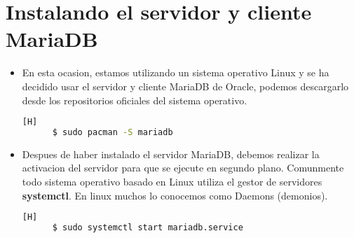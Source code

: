 \newpage %
\section{Instalando el servidor y cliente MariaDB}
\begin{itemize}
  \item En esta ocasion, estamos utilizando un sistema operativo Linux y se ha decidido usar el servidor y cliente MariaDB de Oracle, podemos descargarlo desde los repositorios oficiales del sistema operativo.  
  \begin{lstlisting}[language=bash,caption={Descargando el servidor y el cliente MariaDB}][H]
	  $ sudo pacman -S mariadb
  \end{lstlisting}
\end{itemize}

\begin{itemize}
  \item Despues de haber instalado el servidor MariaDB, debemos realizar la activacion del servidor para que se ejecute en segundo plano. Comunmente todo sistema operativo basado en Linux utiliza el gestor de servidores \textbf{systemctl}. En linux muchos lo conocemos como Daemons (demonios).
  \begin{lstlisting}[language=bash,caption={Descargando el servidor y el cliente MariaDB}][H]
	  $ sudo systemctl start mariadb.service
  \end{lstlisting}
\end{itemize}


